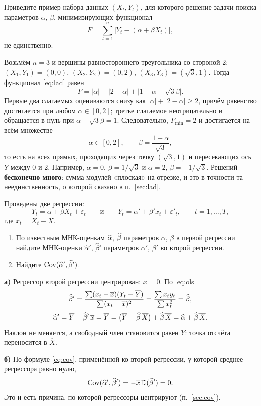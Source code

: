 
Приведите пример набора данных $(X_t, Y_t)$, для которого решение задачи поиска
параметров $\alpha$, $\beta$, минимизирующих функционал
\[
  F = \sum_{t=1}^{n} \bigl|Y_t - (\alpha + \beta X_t)\bigr|,
\]
не единственно.

\begin{solution}
Возьмём $n = 3$ и вершины равностороннего треугольника со стороной 2:
$(X_1,Y_1) = (0,0)$, $(X_2,Y_2) = (0,2)$, $(X_3,Y_3) = (\sqrt{3},1)$. Тогда
функционал \eqref{eq:lad} равен
\[
  F = |\alpha| + |2 - \alpha| + \bigl|1 - \alpha - \sqrt{3}\beta\bigr| .
\]
Первые два слагаемых оцениваются снизу как
$|\alpha| + |2-\alpha| \ge 2$, причём равенство достигается при любом
$\alpha \in [0,2]$; третье слагаемое неотрицательно и обращается в нуль при
$\alpha + \sqrt{3}\beta = 1$. Следовательно, $F_{\min} = 2$ и достигается на
всём множестве
\[
  \alpha \in [0,2], \qquad \beta = \frac{1-\alpha}{\sqrt{3}} ,
\]
то есть на всех прямых, проходящих через точку $(\sqrt{3},1)$ и пересекающих ось
$Y$ между 0 и 2. Например, $\alpha = 0$, $\beta = 1/\sqrt{3}$ и $\alpha = 2$,
$\beta = -1/\sqrt{3}$. Решений \textbf{бесконечно много}: сумма модулей «плоская»
на отрезке, и это в точности та неединственность, о которой сказано в
п.~\ref{sec:lad}.
\end{solution}


Проведены две регрессии:
\[
  Y_t = \alpha + \beta X_t + \varepsilon_t
  \qquad\text{и}\qquad
  Y_t = \alpha' + \beta' x_t + \varepsilon'_t, \qquad t = 1,\dots,T,
\]
где $x_t = X_t - \overline{X}$.
\begin{enumerate}[label=\asbuk*), leftmargin=2.2em, itemsep=3pt]
  \item По известным МНК-оценкам $\widehat{\alpha}$, $\widehat{\beta}$ параметров $\alpha$, $\beta$
        в первой регрессии найдите МНК-оценки $\widehat{\alpha}'$,
        $\widehat{\beta}'$ параметров $\alpha'$, $\beta'$ во второй регрессии.
  \item Найдите $\mathrm{Cov}(\widehat{\alpha}', \widehat{\beta}')$.
\end{enumerate}

\begin{solution}
\textbf{а)} Регрессор второй регрессии центрирован: $\overline{x} = 0$. По
\eqref{eq:ols}
\[
  \widehat{\beta}'
  = \frac{\sum (x_t - \overline{x})(Y_t - \overline{Y})}{\sum (x_t - \overline{x})^2}
  = \frac{\sum x_t y_t}{\sum x_t^2} = \widehat{\beta},
\]
\[
  \widehat{\alpha}' = \overline{Y} - \widehat{\beta}'\,\overline{x} = \overline{Y}
  = \bigl(\overline{Y} - \widehat{\beta}\,\overline{X}\bigr) + \widehat{\beta}\,\overline{X}
  = \widehat{\alpha} + \widehat{\beta}\,\overline{X} .
\]
Наклон не меняется, а свободный член становится равен $\overline{Y}$: точка
отсчёта переносится в $\overline{X}$.

\medskip
\textbf{б)} По формуле \eqref{eq:cov}, применённой ко второй регрессии, у которой
среднее регрессора равно нулю,
\[
  \mathrm{Cov}(\widehat{\alpha}', \widehat{\beta}')
  = -\overline{x}\,\mathbb{D}(\widehat{\beta}') = 0 .
\]
Это и есть причина, по которой регрессоры центрируют (п.~\ref{sec:cov}).
\end{solution}

